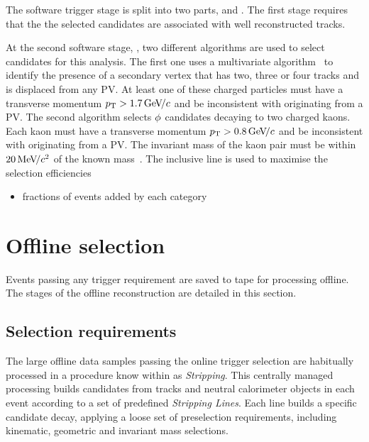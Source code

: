 The software trigger stage is split into two parts, \hltone and \hlttwo.
The first stage \hltone requires that the the selected candidates are associated with well reconstructed tracks.

At the second software stage, \hlttwo, two different algorithms are used to select candidates for this analysis.
The first one uses a multivariate algorithm~\cite{BBDT} to identify the presence of a secondary vertex that has two, three or four tracks and is displaced from any PV. At least one of these charged particles must have a transverse momentum $\mbox{$p_{\mathrm{ T}}$} > 1.7{\mathrm{\,Ge\kern -0.1em V\!/}c}$ and be inconsistent with originating from a PV. 
The second algorithm selects $\phi$ candidates decaying to two charged kaons. Each kaon must have a transverse momentum $\mbox{$p_{\mathrm{ T}}$} > 0.8{\mathrm{\,Ge\kern -0.1em V\!/}c}$ and be inconsistent with originating from a PV. The invariant mass of the kaon pair must be within $20{\mathrm{\,Me\kern -0.1em V\!/}c^2}$ of the known \phiz mass~\cite{PDG2016}.
The inclusive \phiz line is used to maximise the selection efficiencies 

{\color{Red}
\begin{itemize}
\item fractions of events added by each category
\end{itemize}
}

\section{Offline selection}

Events passing any trigger requirement are saved to tape for processing offline. The stages of the offline reconstruction are detailed in this section.

\subsection{Selection requirements}

The large offline data samples passing the online trigger selection are habitually processed in a procedure know within \lhcb as \emph{Stripping}. This centrally managed processing builds candidates from tracks and neutral calorimeter objects in each event according to a set of predefined \emph{Stripping Lines}. Each line builds a specific candidate decay, applying a loose set of preselection requirements, including kinematic, geometric and invariant mass selections. 

